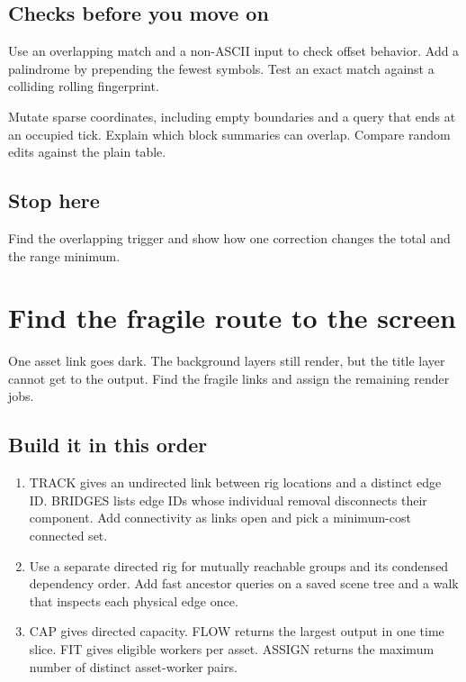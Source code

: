 \documentclass[11pt,letterpaper]{article}
\begin{document}
\subsection*{Checks before you move on}

Use an overlapping match and a non-ASCII input to check offset behavior. Add a palindrome by prepending the fewest symbols. Test an exact match against a colliding rolling fingerprint.

Mutate sparse coordinates, including empty boundaries and a query that ends at an occupied tick. Explain which block summaries can overlap. Compare random edits against the plain table.

\subsection*{Stop here}

Find the overlapping trigger and show how one correction changes the total and the range minimum.

\clearpage

\section{Find the fragile route to the screen}\label{visuals:08}

One asset link goes dark. The background layers still render, but the title layer cannot get to the output. Find the fragile links and assign the remaining render jobs.

\subsection*{Build it in this order}

\begin{enumerate}
\item TRACK gives an undirected link between rig locations and a distinct edge ID. BRIDGES lists edge IDs whose individual removal disconnects their component. Add connectivity as links open and pick a minimum-cost connected set.
\item Use a separate directed rig for mutually reachable groups and its condensed dependency order. Add fast ancestor queries on a saved scene tree and a walk that inspects each physical edge once.
\item CAP gives directed capacity. FLOW returns the largest output in one time slice. FIT gives eligible workers per asset. ASSIGN returns the maximum number of distinct asset-worker pairs.
\end{enumerate}
\end{document}
